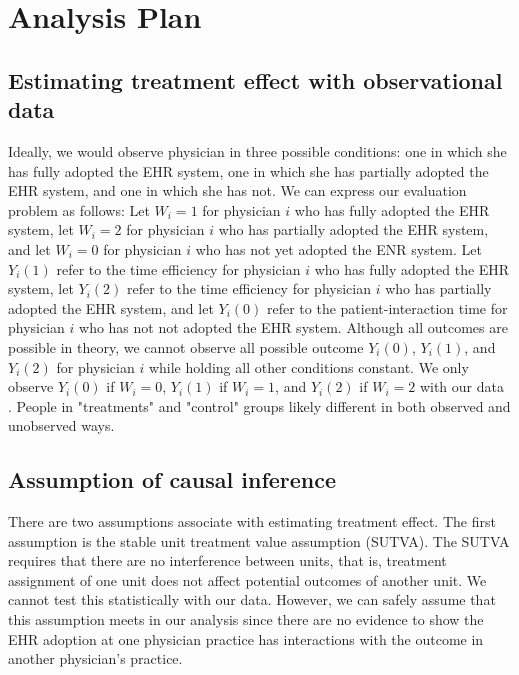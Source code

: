 \section{Analysis Plan}
\subsection{Estimating treatment effect with observational data}
Ideally, we would observe physician in three possible conditions: one in which she has fully adopted the EHR system, one in which she has partially adopted the EHR system, and one in which she has not. We can express our evaluation problem as follows: Let $W_i = 1$ for physician $i$ who has fully adopted the EHR system, let $W_i = 2$ for physician $i$ who has partially adopted the EHR system, and let $W_i = 0$ for physician $i$ who has not yet adopted the ENR system. Let $Y_i(1)$ refer to the time efficiency for physician $i$ who has fully adopted the EHR system, let $Y_i(2)$ refer to the time efficiency for physician $i$ who has partially adopted the EHR system, and let $Y_i(0)$ refer to the patient-interaction time for physician $i$ who has not not adopted the EHR system. Although all outcomes are possible in theory, we cannot observe all possible outcome $Y_i(0)$, $Y_i(1)$, and $Y_i(2)$ for physician $i$ while holding all other conditions constant. We only observe $Y_i(0)$ if $W_i = 0$, $Y_i(1)$ if $W_i = 1$, and $Y_i(2)$ if $W_i = 2$ with our data \citep{imbens2008recent}. People in "treatments" and "control" groups likely different in both observed and unobserved ways.

\subsection{Assumption of causal inference}
There are two assumptions associate with estimating treatment effect. The first assumption is the stable unit treatment value assumption (SUTVA). The SUTVA requires that there are no interference between units, that is, treatment assignment of one unit does not affect potential outcomes of another unit. We cannot test this statistically with our data. However, we can safely assume that this assumption meets in our analysis since there are no evidence to show the EHR adoption at one physician practice has interactions with the outcome in another physician's practice.

